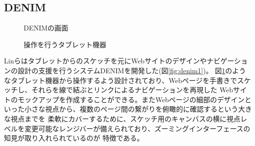 \subsection{DENIM}
\label{denim}

\begin{figure}[H] \begin{minipage}{0.5\hsize}
                         \begin{center} 
                         \end{center} \caption{DENIMの画面} \label{fig:denim1}
\end{minipage} \begin{minipage}{0.5\hsize}
                   \begin{center} 
                   \end{center} \caption{操作を行うタブレット機器} \label{fig:denim2}
\end{minipage}
\end{figure}

Linらはタブレットからのスケッチを元にWebサイトのデザインやナビゲーションの設計の支援を行うシステムDENIMを開発した\cite{Lin2000DENIMFA}(図\ref{fig:denim1})。
図\ref{fig:denim2}のようなタブレット機器から操作するよう設計されており、Webページを手書きでスケッチし、それらを線で結ぶとリンクによるナビゲーションを再現した
Webサイトのモックアップを作成することができる。またWebページの細部のデザインといった小さな視点から、複数のページ間の繋がりを俯瞰的に確認するという大きな視点までを
柔軟にカバーするために、スケッチ用のキャンバスの横に視点レベルを変更可能なレンジバーが備えられており、ズーミングインターフェースの知見が取り入れられているのが
特徴である。

